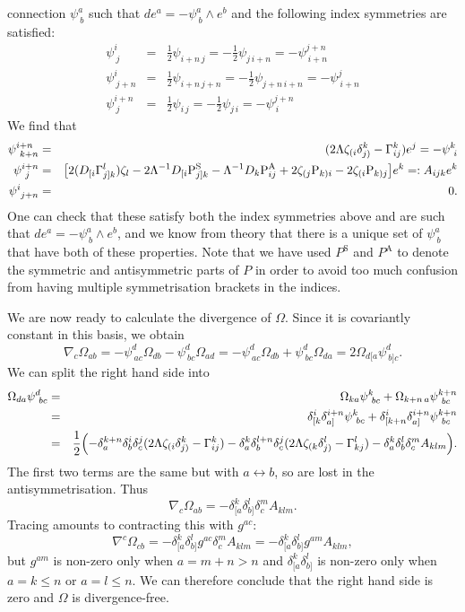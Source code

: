 connection $\psi_{\ b}^{a}$ such that ${d}e^{a}=-\psi_{\ b}^{a}\wedge e^{b}$
and the following index symmetries are satisfied:
\begin{eqnarray*}
\psi_{\ j}^{i} & = & \frac{1}{2}\psi_{i+n\, j}=-\frac{1}{2}\psi_{j\, i+n}=-\psi_{\ i+n}^{j+n}\\
\psi_{\ j+n}^{i} & = & \frac{1}{2}\psi_{i+n\, j+n}=-\frac{1}{2}\psi_{j+n\, i+n}=-\psi_{\ i+n}^{j}\\
\psi_{\ j}^{i+n} & = & \frac{1}{2}\psi_{i\, j}=-\frac{1}{2}\psi_{j\, i}=-\psi_{\ i}^{j+n}
\end{eqnarray*}
We find that 
\begin{eqnarray*}
\psi_{\ k+n}^{i+n} & = & (2\Lambda \zeta_{(i}\delta_{j)}^{k}-\Gamma_{ij}^{k})e^{j}=-\psi_{\ i}^{k}\\
\psi_{\ j}^{i+n} & = & \bigl[2(D_{[i}\Gamma_{j]k}^{l})\zeta_{l}-2\Lambda^{-1}D_{[i}\mathrm{P}_{j]k}^{\mathrm{S}}-\Lambda^{-1}D_{k}\mathrm{P}_{ij}^{\mathrm{A}}+2\zeta_{(j}\mathrm{P}_{k)i}-2\zeta_{(i}\mathrm{P}_{k)j}\bigr]e^{k}=:A_{ijk}e^{k}\\
\psi_{\ j+n}^{i} & = & 0.
\end{eqnarray*}
One can check that these satisfy both the index symmetries above and
are such that $ de^{a}=-\psi_{\ b}^{a}\wedge e^{b}$, and
we know from theory that there is a unique set of $\psi_{\ b}^{a}$
that have both of these properties. Note that we have used $P^{\mathrm{S}}$
and $P^{\mathrm{A}}$ to denote the symmetric and antisymmetric parts
of $P$ in order to avoid too much confusion from having multiple
symmetrisation brackets in the indices.

We are now ready to calculate the divergence of $\Omega$. Since it
is covariantly constant in this basis, we obtain
\[
\nabla_{c}\Omega_{ab}=-\psi_{\ ac}^{d}\Omega_{db}-\psi_{\ bc}^{d}\Omega_{ad}=-\psi_{\ ac}^{d}\Omega_{db}+\psi_{\ bc}^{d}\Omega_{da}=2\Omega_{d[a}\psi_{\ b]c}^{d}.
\]
We can split the right hand side into
\begin{eqnarray*}
\Omega_{da}\psi_{\ bc}^{d} & = & \Omega_{ka}\psi_{\ bc}^{k}+\Omega_{k+n\, a}\psi_{\ bc}^{k+n}\\
 & = & \delta_{[k}^{i}\delta_{a]}^{i+n}\psi_{\ bc}^{k}+\delta_{[k+n}^{i}\delta_{a]}^{i+n}\psi_{\ bc}^{k+n}\\
 & = & \frac{1}{2}\Bigl(-\delta_{a}^{k+n}\delta_{b}^{i}\delta_{c}^{j}(2\Lambda \zeta_{(i}\delta_{j)}^{k}-\Gamma_{ij}^{k})-\delta_{a}^{k}\delta_{b}^{l+n}\delta_{c}^{j}(2\Lambda \zeta_{(k}\delta_{j)}^{l}-\Gamma_{kj}^{l})-\delta_{a}^{k}\delta_{b}^{l}\delta_{c}^{m}A_{klm}\Bigr).\\
\end{eqnarray*}
The first two terms are the same but with $a\leftrightarrow b$, so
are lost in the antisymmetrisation. Thus
\[
\nabla_{c}\Omega_{ab}=-\delta_{[a}^{k}\delta_{b]}^{l}\delta_{c}^{m}A_{klm}.
\]
Tracing amounts to contracting this with $g^{ac}$:
\[
\nabla^{c}\Omega_{cb}=-\delta_{[a}^{k}\delta_{b]}^{l}g^{ac}\delta_{c}^{m}A_{klm}=-\delta_{[a}^{k}\delta_{b]}^{l}g^{am}A_{klm},
\]
but $g^{am}$ is non-zero only when $a=m+n>n$ and $\delta_{[a}^{k}\delta_{b]}^{l}$
is non-zero only when $a=k\leq n$ or $a=l\leq n$. We can therefore
conclude that the right hand side is zero and $\Omega$ is divergence-free.
\koniec

